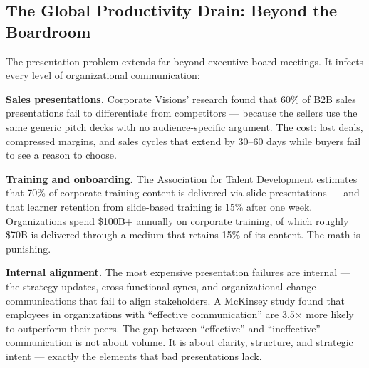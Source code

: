 \subsection{The Global Productivity Drain: Beyond the Boardroom}

The presentation problem extends far beyond executive board meetings. It infects every level of organizational communication:

\textbf{Sales presentations.} Corporate Visions' research found that 60\% of B2B sales presentations fail to differentiate from competitors --- because the sellers use the same generic pitch decks with no audience-specific argument. The cost: lost deals, compressed margins, and sales cycles that extend by 30--60 days while buyers fail to see a reason to choose.

\textbf{Training and onboarding.} The Association for Talent Development estimates that 70\% of corporate training content is delivered via slide presentations --- and that learner retention from slide-based training is 15\% after one week. Organizations spend \$100B+ annually on corporate training, of which roughly \$70B is delivered through a medium that retains 15\% of its content. The math is punishing.

\textbf{Internal alignment.} The most expensive presentation failures are internal --- the strategy updates, cross-functional syncs, and organizational change communications that fail to align stakeholders. A McKinsey study found that employees in organizations with ``effective communication'' are 3.5$\times$ more likely to outperform their peers. The gap between ``effective'' and ``ineffective'' communication is not about volume. It is about clarity, structure, and strategic intent --- exactly the elements that bad presentations lack.

